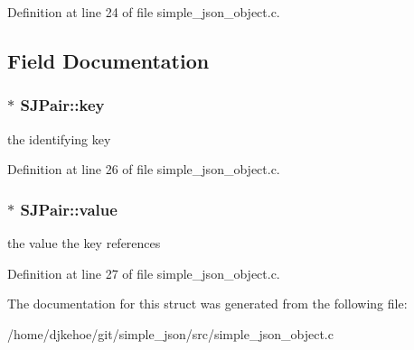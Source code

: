 Definition at line 24 of file simple\+\_\+json\+\_\+object.\+c.



\subsection{Field Documentation}
\subsubsection[{\texorpdfstring{key}{key}}]{$\ast$ S\+J\+Pair\+::key}\hypertarget{structSJPair_a23681f167b9eac4d55be408c2007ae6c}{}\label{structSJPair_a23681f167b9eac4d55be408c2007ae6c}
the identifying key 

Definition at line 26 of file simple\+\_\+json\+\_\+object.\+c.

\subsubsection[{\texorpdfstring{value}{value}}]{$\ast$ S\+J\+Pair\+::value}\hypertarget{structSJPair_aeee74c0e0e05940043b8aa96d1be43a4}{}\label{structSJPair_aeee74c0e0e05940043b8aa96d1be43a4}
the value the key references 

Definition at line 27 of file simple\+\_\+json\+\_\+object.\+c.



The documentation for this struct was generated from the following file\+:\begin{DoxyCompactItemize}
\item 
/home/djkehoe/git/simple\+\_\+json/src/simple\+\_\+json\+\_\+object.\+c\end{DoxyCompactItemize}

